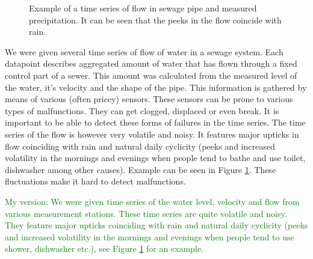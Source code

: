 \documentclass[12pt,a4paper]{article}
\begin{document}
\begin{figure}[ht]
  \noindent{}
  \caption{Example of a time series of flow in sewage pipe and measured precipitation. It can be seen that the peeks in the flow coincide with rain.}
    \label{rain_data}
\end{figure}

We were given several time series of flow of water in a sewage system. Each datapoint describes aggregated amount of water that has flown through a fixed control part of a sewer. This amount was calculated from the measured level of the water, it's velocity and the shape of the pipe. This information is gathered by means of various (often pricey) sensors. These sensors can be prone to various types of malfunctions. They can get clogged, displaced or even break. It is important to be able to detect these forms of failures in the time series. The time series of the flow is however very volatile and noisy. It features major upticks in flow coinciding with rain and natural daily cyclicity (peeks and increased volatility in the mornings and evenings when people tend to bathe and use toilet, dishwasher among other causes). Example can be seen in Figure \ref{rain_data}. These fluctuations make it hard to detect malfunctions.

\textcolor{green}{My version: We were given time series of the water level, velocity and flow from various measurement stations.  These time series are quite  volatile and noisy. They feature major upticks  coinciding with rain and natural daily cyclicity (peeks and increased volatility in the mornings and evenings when people tend to use shower, dishwasher etc.), see Figure \ref{rain_data} for an example.}
\end{document}
